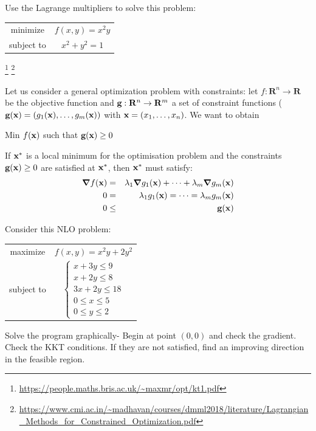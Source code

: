 \begin{Exercise}
  Use the Lagrange multipliers to solve this problem:
  \begin{center}
    \begin{tabular}{cc}
      minimize & $f(x,y)=x^2y$ \\
      subject to & $x^2+y^2=1$
    \end{tabular}
  \end{center}
\end{Exercise}
  \footnote{\url{https://people.maths.bris.ac.uk/~maxmr/opt/kt1.pdf}}
  \footnote{\url{https://www.cmi.ac.in/~madhavan/courses/dmml2018/literature/Lagrangian_Methods_for_Constrained_Optimization.pdf}}

  Let us consider a general optimization problem with constraints: let $f:\mathbf{R}^n \rightarrow \mathbf{R}$ be the objective function and $\textbf{g}:\mathbf{R}^n \rightarrow \mathbf{R}^m$ a set of constraint functions ($\textbf{g}(\textbf{x})=(g_1(\textbf{x}),\ldots,g_m(\textbf{x}))$ with $\textbf{x}=(x_1,\ldots,x_n)$. We want to obtain
  \begin{center}
  Min $f(\textbf{x})$ such that $\textbf{g}(\textbf{x})\geq 0$
\end{center}
  \begin{theorem}
    If $\textbf{x}^*$ is a local minimum for the optimisation problem and the constraints $\textbf{g}(\textbf{x})\geq 0$ are satisfied at $\textbf{x}^*$, then $\textbf{x}^*$ must satisfy:
    \begin{eqnarray*}
      \grad f({\textbf{x}})&=&\lambda_1 \grad g_1(\textbf{x})+\cdots+\lambda_m \grad g_m(\textbf{x})\\
      0&=&\lambda_1  g_1(\textbf{x})=\cdots=\lambda_m  g_m(\textbf{x})\\
      0&\leq&\textbf{g}(\textbf{x})
    \end{eqnarray*}
  \end{theorem}



  \begin{Exercise}
     Consider this NLO problem\cite{carter_operations_2019}:
    \begin{center}
     \begin{tabular}{cc}
      maximize & $f(x,y)=x^2y+2y^2$ \\
      subject to & $\begin{cases}x+3y\leq 9\\x+2y\leq 8\\3x+2y\leq 18\\0\leq x \leq 5\\0\leq y \leq 2\end{cases}$
    \end{tabular}
  \end{center}
    Solve the program graphically- Begin at point $(0,0)$ and check the gradient. Check the KKT conditions. If they are not satisfied, find an improving direction in the feasible region.
  \end{Exercise}


